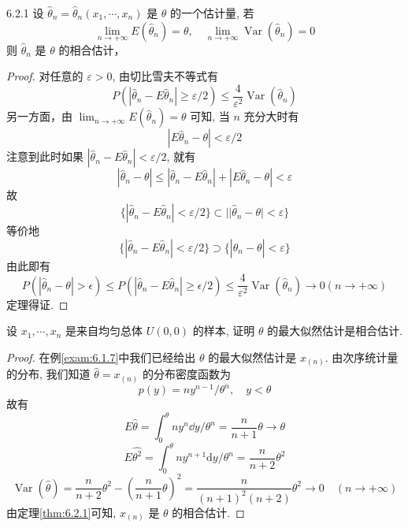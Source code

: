 \begin{theorem}{}{6.2.1}
设 $\hat{\theta}_n=\hat{\theta}_n(x_1,\cdots,x_n)$ 是 $\theta$ 的一个估计量, 若
\begin{equation}\label{eq:6.2.2}
\lim _{n \rightarrow+\infty} E(\hat{\theta}_{n})=\theta, \quad \lim _{n \rightarrow+\infty} \operatorname{Var}(\hat{\theta}_{n})=0
\end{equation}
则 $\hat{\theta}_n$ 是 $\theta$ 的相合估计，
\end{theorem}\begin{proof}
对任意的 $\varepsilon>0$, 由切比雪夫不等式有
\[P(|\hat{\theta}_{n}-E \hat{\theta}_{n}| \geqslant \varepsilon / 2) \leqslant \frac{4}{\varepsilon^{2}} \operatorname{Var}(\hat{\theta}_{n})\]
另一方面，由 $\lim _{n \rightarrow+\infty} E(\hat{\theta}_{n})=\theta$ 可知, 当 $n$ 充分大时有
\[|E \hat{\theta}_{n}-\theta|<\varepsilon / 2\]
注意到此时如果 $|\hat{\theta}_n-E\hat{\theta}_n|<\varepsilon/2$, 就有
\[|\hat{\theta}_{n}-\theta| \leqslant|\hat{\theta}_{n}-E \hat{\theta}_{n}|+|E \hat{\theta}_{n}-\theta|<\varepsilon\]
故
\[\{|\hat{\theta}_{n}-E \hat{\theta}_{n}|<\varepsilon / 2\} \subset| | \hat{\theta}_{n}-\theta |<\varepsilon \}\]
等价地
\[\{ | \hat{\theta}_{n}-E \hat{\theta}_{n}|< \varepsilon/ 2 \} \supset\{|\hat{\theta}_{n}-\theta|<\varepsilon \}\]
由此即有
\[P(|\hat{\theta}_{n}-\theta|>\epsilon) \leqslant P(|\hat{\theta}_{n}-E \hat{\theta}_{n}| \geqslant \epsilon / 2) \leqslant \frac{4}{\varepsilon^{2}} \operatorname{Var}(\hat{\theta}_{n}) \rightarrow 0(n \rightarrow+\infty)\]
定理得证.
\end{proof}

\begin{example}\label{exam:6.2.2}
设 $x_1,\cdots,x_n$ 是来自均匀总体 $U(0,0)$ 的样本, 证明 $\theta$ 的最大似然估计是相合估计.
\end{example}
\begin{proof}
在例\ref{exam:6.1.7}中我们已经给出 $\theta$ 的最大似然估计是 $x_{(n)}$.  由次序统计量的分布, 我们知道 $\hat{\theta}=x_{(n)}$ 的分布密度函数为
\[p(y)=n y^{n-1} / \theta^{n}, \quad y<\theta\]
故有
\[E \hat{\theta}=\int_{0}^{\theta} n y^{n}\dd y / \theta^{n}=\frac{n}{n+1} \theta \rightarrow \theta\]
\[E \hat{\theta^{2}}=\int_{0}^{\theta} n y^{n+1} \mathrm{d} y / \theta^{n}=\frac{n}{n+2} \theta^{2}\]
\[\operatorname{Var}(\hat{\theta})=\frac{n}{n+2} \theta^{2}-\left(\frac{n}{n+1} \theta\right)^{2}=\frac{n}{(n+1)^{2}(n+2)} \theta^{2} \rightarrow 0 \quad(n \rightarrow+\infty)\]
由定理\ref{thm:6.2.1}可知,  $x_{(n)}$ 是 $\theta$ 的相合估计.
\end{proof}

